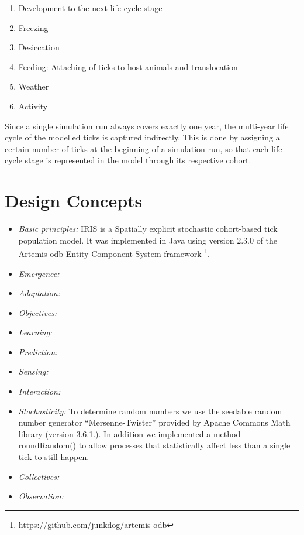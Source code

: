 \documentclass[a4paper, 11pt]{scrartcl}
\begin{document}
\begin{enumerate}
	\item Development to the next life cycle stage
	\item Freezing
	\item Desiccation
	\item Feeding: Attaching of ticks to host animals and translocation
	\item Weather
	\item Activity
\end{enumerate}

Since a single simulation run always covers exactly one year, the multi-year life cycle of the modelled ticks is captured indirectly. This is done by assigning a certain number of ticks at the beginning of a simulation run, so that each life cycle stage is represented in the model through its respective cohort.


\newpage


\section{Design Concepts}

\begin{itemize}

\item \emph{Basic principles:}
IRIS is a Spatially explicit stochastic cohort-based tick population model. It was implemented in Java using version 2.3.0 of the Artemis-odb Entity-Component-System framework \footnote{\url{https://github.com/junkdog/artemis-odb}}.

\item \emph{Emergence:}

\item \emph{Adaptation:}

\item \emph{Objectives:}

\item \emph{Learning:}

\item \emph{Prediction:}

\item \emph{Sensing:}

\item \emph{Interaction:}

\item \emph{Stochasticity:}
To determine random numbers we use the seedable random number generator ``Mersenne-Twister'' provided by Apache Commons Math library (version 3.6.1.). In addition we implemented a method roundRandom() to allow processes that statistically affect less than a single tick to still happen.

\item \emph{Collectives:}

\item \emph{Observation:}

\end{itemize}
\end{document}
